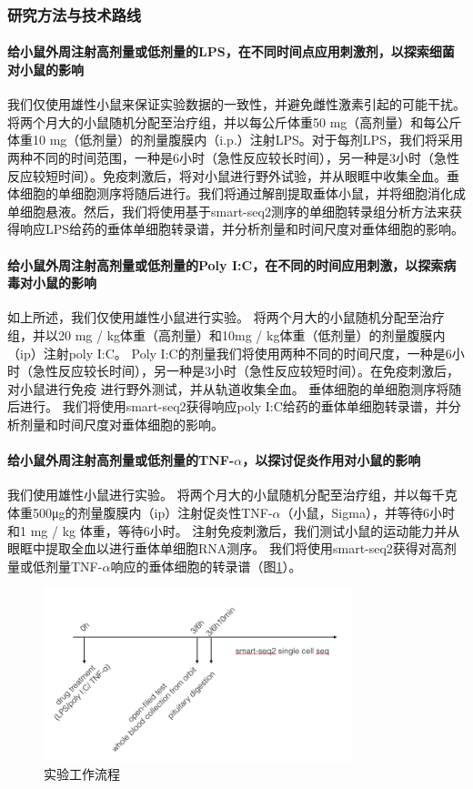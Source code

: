 \documentclass[class = opening]{whuthesis}
\begin{document}
\subsubsection{研究方法与技术路线}
\paragraph{给小鼠外周注射高剂量或低剂量的LPS，在不同时间点应用刺激剂，以探索细菌对小鼠的影响}
  我们仅使用雄性小鼠来保证实验数据的一致性，并避免雌性激素引起的可能干扰。将两个月大的小鼠随机分配至治疗组，并以每公斤体重50 mg（高剂量）和每公斤体重10 mg（低剂量）的剂量腹膜内（i.p.）注射LPS。对于每剂LPS，我们将采用两种不同的时间范围，一种是6小时（急性反应较长时间），另一种是3小时（急性反应较短时间）。免疫刺激后，将对小鼠进行野外试验，并从眼眶中收集全血。垂体细胞的单细胞测序将随后进行。我们将通过解剖提取垂体小鼠，并将细胞消化成单细胞悬液。然后，我们将使用基于smart-seq2测序的单细胞转录组分析方法来获得响应LPS给药的垂体单细胞转录谱，并分析剂量和时间尺度对垂体细胞的影响。
\paragraph{给小鼠外周注射高剂量或低剂量的Poly I:C，在不同的时间应用刺激，以探索病毒对小鼠的影响}
  如上所述，我们仅使用雄性小鼠进行实验。 将两个月大的小鼠随机分配至治疗组，并以20 mg / kg体重（高剂量）和10mg / kg体重（低剂量）的剂量腹膜内（ip）注射poly I:C。 Poly I:C的剂量我们将使用两种不同的时间尺度，一种是6小时（急性反应较长时间），另一种是3小时（急性反应较短时间）。在免疫刺激后，对小鼠进行免疫 进行野外测试，并从轨道收集全血。 垂体细胞的单细胞测序将随后进行。 我们将使用smart-seq2获得响应poly I:C给药的垂体单细胞转录谱，并分析剂量和时间尺度对垂体细胞的影响。
\paragraph{给小鼠外周注射高剂量或低剂量的TNF-$\alpha$，以探讨促炎作用对小鼠的影响}
  我们使用雄性小鼠进行实验。 将两个月大的小鼠随机分配至治疗组，并以每千克体重500μg的剂量腹膜内（ip）注射促炎性TNF-$\alpha$（小鼠，Sigma），并等待6小时和1 mg / kg 体重，等待6小时。 注射免疫刺激后，我们测试小鼠的运动能力并从眼眶中提取全血以进行垂体单细胞RNA测序。 我们将使用smart-seq2获得对高剂量或低剂量TNF-$\alpha$响应的垂体细胞的转录谱（图\ref{fig:scseq-expr}）。
\begin{figure}[!htb]
  \centering
  \includegraphics[width=0.8\textwidth]{figs/scseq-expr.png}
  \caption{实验工作流程}
  \label{fig:scseq-expr}
\end{figure}
\end{document}
